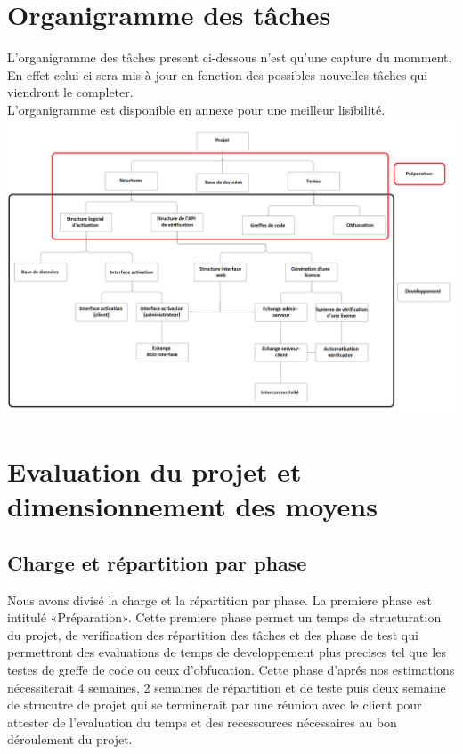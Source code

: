 \chapter{Organigramme des tâches}
L'organigramme des tâches present ci-dessous n'est qu'une capture du momment. En effet celui-ci sera mis à jour en fonction 
des possibles nouvelles tâches qui viendront le completer. \\

L'organigramme est disponible en annexe pour une meilleur lisibilité.\\ \newline
\includegraphics[width=18cm]{organi.png}

\chapter{Evaluation du projet et dimensionnement des moyens}
\section{Charge et répartition par phase}
Nous avons divisé la charge et la répartition par phase. La premiere phase est intitulé «Préparation». Cette premiere phase permet
un temps de structuration du projet, de verification des répartition des tâches et des phase de test qui permettront des evaluations de temps de
developpement plus precises tel que les testes de greffe de code ou ceux d'obfucation. Cette phase d'aprés nos estimations nécessiterait 4 semaines, 2 semaines de 
répartition et de teste puis deux semaine de strucutre de projet qui se terminerait par une réunion avec le client pour attester de l'evaluation du temps
et des recessources nécessaires au bon déroulement du projet.
\\ \newline

